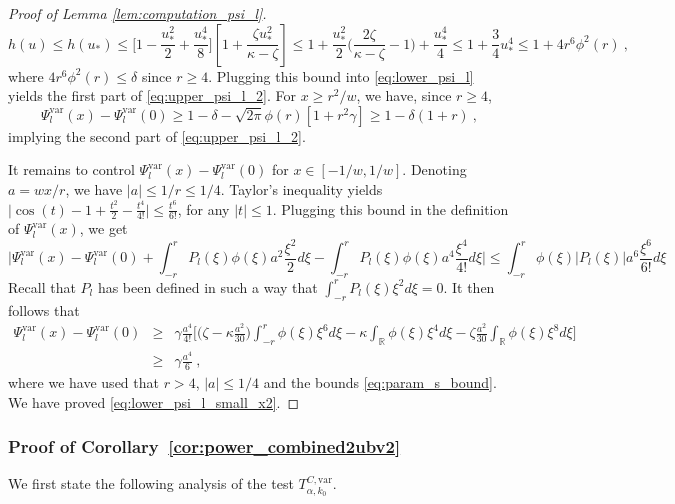 \documentclass[twoside,11pt]{article}
\def\beqn{\begin{eqnarray*}}
\def\eeqn{\end{eqnarray*}}
\newcommand{\<}{\langle}
\renewcommand{\>}{\rangle}
\begin{document}
\begin{proof}[Proof of Lemma \ref{lem:computation_psi_l}]
\[
 h(u) \leq  h(u_*)\leq \big[1 - \frac{u_*^2}{2} + \frac{u_*^4}{8}\big][1+ \frac{\zeta u_*^2 }{\kappa -\zeta }]\leq 1+   \frac{u_*^2}{2}\big( \frac{2\zeta}{\kappa-\zeta} - 1 \big) + \frac{u_*^4}{4} \leq 1 + \frac{3}{4}u_*^4\leq 1+ 4r^6\phi^2(r)\ ,
\]
where $4r^6\phi^2(r)\leq \delta$ since $r\geq 4$. Plugging this bound into \eqref{eq:lower_psi_l} yields the first part of \eqref{eq:upper_psi_l_2}. For $x\geq r^2/w$, we have, since $r\geq 4$,
\[
 \Psi^{\mathrm{var}}_l(x)-\Psi^{\mathrm{var}}_l(0)\geq 1  - \delta - \sqrt{2\pi}\phi(r)[1+ r^2\gamma ]\geq 1 - \delta (1+r)\ ,
\]
implying the second part of \eqref{eq:upper_psi_l_2}.
\medskip 

It remains to control $\Psi^{\mathrm{var}}_l(x) - \Psi^{\mathrm{var}}_l(0)$ for $x\in [-1/w,1/w]$. Denoting $a=wx/r$, we have $|a|\leq 1/r\leq 1/4$.
Taylor's inequality yields $\big|\cos(t) - 1+ \tfrac{t^2}{2}-  \tfrac{t^4}{4!}\big|\leq \tfrac{t^6}{6!}$, for any $|t|\leq 1$. Plugging this bound in the definition of $\Psi^{\mathrm{var}}_l(x)$, we get 
\[
\Big|\Psi^{\mathrm{var}}_l(x)- \Psi^{\mathrm{var}}_l(0)+ \int_{-r}^{r}P_l(\xi)\phi(\xi) a^2\frac{\xi^2}{2}d\xi - \int_{-r}^{r}P_l(\xi)\phi(\xi) a^4\frac{\xi^4}{4!}d\xi \Big|\leq \int_{-r}^{r}\phi(\xi)|P_l(\xi)| a^6\frac{\xi^6}{6!}d\xi
\]
Recall that $P_l$ has been defined in such a way that $\int_{-r}^{r}P_l(\xi)\xi^2d\xi=0$. It then follows that 
\beqn
\Psi^{\mathrm{var}}_l(x)- \Psi^{\mathrm{var}}_l(0)&\geq&  \gamma \frac{a^4}{4!}\Big[ \big(\zeta - \kappa \frac{a^2}{30}\big)  \int_{-r}^{r}\phi(\xi)\xi^6 d\xi  - \kappa \int_{\mathbb{R}}\phi(\xi)\xi^4d\xi - \zeta\frac{a^2}{30}\int_{\mathbb{R}}\phi(\xi)\xi^8d\xi\Big]\\ 
&\geq & \gamma \frac{a^4}{6}\ ,
\eeqn
where we have used that $r>4$, $|a|\leq 1/4$ and  the bounds \eqref{eq:param_s_bound}. We have proved \eqref{eq:lower_psi_l_small_x2}.



\end{proof}






\subsubsection{Proof of Corollary~\ref{cor:power_combined2ubv2}}



We first state the following analysis of the test $T^{C,\mathrm{var}}_{\alpha,k_0}$. 
\end{document}
